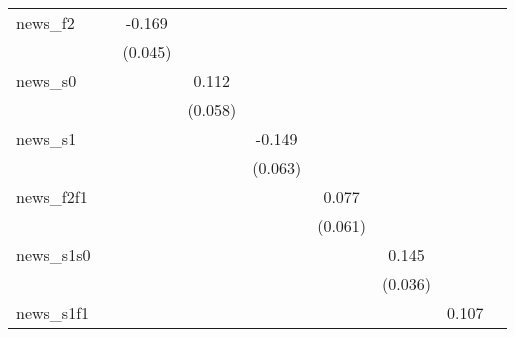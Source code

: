 {\begin{tabular}{l*{8}{c}}
news\_f2     &                     &      -0.169\sym{***}&                     &                     &                     &                     &                     &                     \\
            &                     &     (0.045)         &                     &                     &                     &                     &                     &                     \\
\addlinespace
news\_s0     &                     &                     &       0.112\sym{*}  &                     &                     &                     &                     &                     \\
            &                     &                     &     (0.058)         &                     &                     &                     &                     &                     \\
\addlinespace
news\_s1     &                     &                     &                     &      -0.149\sym{**} &                     &                     &                     &                     \\
            &                     &                     &                     &     (0.063)         &                     &                     &                     &                     \\
\addlinespace
news\_f2f1   &                     &                     &                     &                     &       0.077         &                     &                     &                     \\
            &                     &                     &                     &                     &     (0.061)         &                     &                     &                     \\
\addlinespace
news\_s1s0   &                     &                     &                     &                     &                     &       0.145\sym{***}&                     &                     \\
            &                     &                     &                     &                     &                     &     (0.036)         &                     &                     \\
\addlinespace
news\_s1f1   &                     &                     &                     &                     &                     &                     &       0.107         &                     \\

\end{tabular}}
